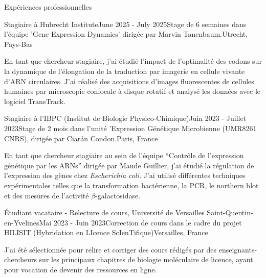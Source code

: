\documentclass[
	10pt,
]{style} %
\begin{document}
\begin{rSection}{Expériences professionnelles}

	\begin{rSubsection}{Stagiaire à Hubrecht Institute}{June 2025 - July 2025}{Stage de 6 semaines dans l'équipe 'Gene Expression Dynamics' dirigée par Marvin Tanenbaum.}{Utrecht, Pays-Bas}
		\item En tant que chercheur stagiaire, j'ai étudié l'impact de l'optimalité des codons sur la dynamique de l’élongation de la traduction par imagerie en cellule vivante d’ARN circulaires. J’ai réalisé des acquisitions d’images fluorescentes de cellules humaines par microscopie confocale à disque rotatif et analysé les données avec le logiciel TransTrack.
	\end{rSubsection}

	\begin{rSubsection}{Stagiaire à l'IBPC (Institut de Biologie Physico-Chimique)}{Juin 2023 - Juillet 2023}{Stage de 2 mois dans l'unité 'Expression Génétique Microbienne (UMR8261 CNRS), dirigée par Ciarán Condon.}{Paris, France}
		\item En tant que chercheur stagiaire au sein de l'équipe ``Contrôle de l'expression génétique par les ARNs'' dirigée par Maude Guillier, j'ai étudié la régulation de l'expression des gènes chez \textit{Escherichia coli.} J'ai utilisé différentes techniques expérimentales telles que la transformation bactérienne, la PCR, le northern blot et des mesures de l’activité $\beta$-galactosidase.

	\end{rSubsection}


	\begin{rSubsection}{Étudiant vacataire - Relecture de cours, Université de Versailles Saint-Quentin-en-Yvelines}{Mai 2023 - Juin 2023}{Correction de cours dans le cadre du projet HILISIT (Hybridation en LIcence ScIenTifique)}{Versailles, France}
		\item J'ai été sélectionnée pour relire et corriger des cours rédigés par des enseignants-chercheurs sur les principaux chapitres de biologie moléculaire de licence, ayant pour vocation de devenir des ressources en ligne.
	\end{rSubsection}

\end{rSection}

\end{document}

